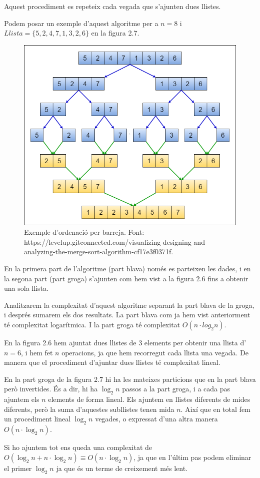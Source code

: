 Aquest procediment es repeteix cada vegada que s'ajunten dues llistes.

Podem posar un exemple d'aquest algoritme per a $n = 8$ i $Llista = \lbrace5, 2, 4, 7, 1, 3, 2, 6\rbrace$ en la figura 2.7.

\begin{figure}[H]
    \centering
    \includegraphics[width=.5\textwidth]{capitols/figures/merge5.png}
    \caption[Exemple d'ordenació per barreja.]{Exemple d'ordenació per barreja. Font: https://levelup.gitconnected.com/visualizing-designing-and-analyzing-the-merge-sort-algorithm-cf17e3f0371f.}
    \label{fig:my_label}
\end{figure}

\vspace{-18pt}
En la primera part de l'algoritme (part blava) només es parteixen les dades, i en la segona part (part groga) s'ajunten com hem vist a la figura 2.6 fins a obtenir una sola llista.

Analitzarem la complexitat d'aquest algoritme separant la part blava de la groga, i després sumarem els dos resultats. La part blava com ja hem vist anteriorment té complexitat logarítmica. I la part groga té complexitat $O(n \cdot log_2{n})$.

En la figura 2.6 hem ajuntat dues llistes de 3 elements per obtenir una llista d'$n = 6$, i hem fet $n$ operacions, ja que hem recorregut cada llista una vegada. De manera que el procediment d'ajuntar dues llistes té complexitat lineal.

En la part groga de la figura 2.7 hi ha les mateixes particions que en la part blava però invertides. És a dir, hi ha $\log_2{n}$ passos a la part groga, i a cada pas ajuntem els $n$ elements de forma lineal. Els ajuntem en llistes diferents de mides diferents, però la suma d'aquestes subllistes tenen mida $n$. Així que en total fem un procediment lineal $\log_2{n}$ vegades, o expressat d'una altra manera $O(n \cdot \log_2{n})$.

Si ho ajuntem tot ens queda una complexitat de $O(\log_2{n} + n \cdot \log_2{n}) \equiv O(n \cdot \log_2{n})$, ja que en l'últim pas podem eliminar el primer $\log_2{n}$ ja que és un terme de creixement més lent.

